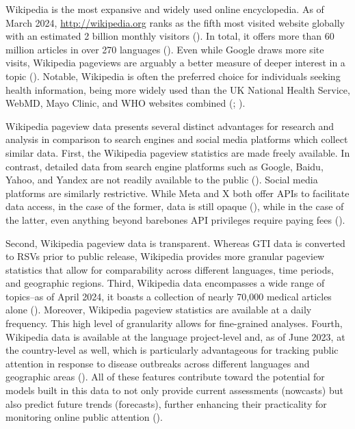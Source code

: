 \documentclass[
  12pt,
]{article}
\begin{document}
Wikipedia is the most expansive and widely used online encyclopedia. As
of March 2024, \url{http://wikipedia.org} ranks as the fifth most
visited website globally with an estimated 2 billion monthly visitors
(). In
total, it offers more than 60 million articles in over 270 languages
(). Even while Google draws
more site visits, Wikipedia pageviews are arguably a better measure of
deeper interest in a topic (). Notable, Wikipedia is often the preferred choice for individuals
seeking health information, being more widely used than the UK National
Health Service, WebMD, Mayo Clinic, and WHO websites combined
(;
).

Wikipedia pageview data presents several distinct advantages for
research and analysis in comparison to search engines and social media
platforms which collect similar data. First, the Wikipedia pageview
statistics are made freely available. In contrast, detailed data from
search engine platforms such as Google, Baidu, Yahoo, and Yandex are not
readily available to the public (). Social media platforms are similarly restrictive. While Meta
and X both offer APIs to facilitate data access, in the case of the
former, data is still opaque (), while
in the case of the latter, even anything beyond barebones API privileges
require paying fees ().

Second, Wikipedia pageview data is transparent. Whereas GTI data is
converted to RSVs prior to public release, Wikipedia provides more
granular pageview statistics that allow for comparability across
different languages, time periods, and geographic regions. Third,
Wikipedia data encompasses a wide range of topics--as of April 2024, it
boasts a collection of nearly 70,000 medical articles alone
(). Moreover,
Wikipedia pageview statistics are available at a daily frequency. This
high level of granularity allows for fine-grained analyses. Fourth,
Wikipedia data is available at the language project-level and, as of
June 2023, at the country-level as well, which is particularly
advantageous for tracking public attention in response to disease
outbreaks across different languages and geographic areas
(). All of these
features contribute toward the potential for models built in this data
to not only provide current assessments (nowcasts) but also predict
future trends (forecasts), further enhancing their practicality for
monitoring online public attention ().
\end{document}
